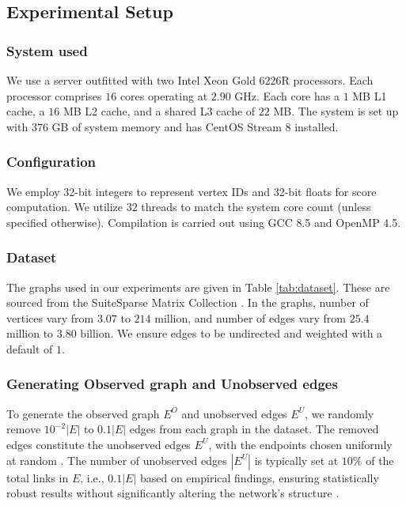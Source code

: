 \subsection{Experimental Setup}
\label{sec:setup}

\subsubsection{System used}

We use a server outfitted with two Intel Xeon Gold 6226R processors. Each processor comprises $16$ cores operating at $2.90$ GHz. Each core has a $1$ MB L1 cache, a $16$ MB L2 cache, and a shared L3 cache of $22$ MB. The system is set up with $376$ GB of system memory and has CentOS Stream 8 installed.\ok{}


\subsubsection{Configuration}

We employ 32-bit integers to represent vertex IDs and 32-bit floats for score computation. We utilize $32$ threads to match the system core count (unless specified otherwise). Compilation is carried out using GCC 8.5 and OpenMP 4.5.\ok{}


\subsubsection{Dataset}

The graphs used in our experiments are given in Table \ref{tab:dataset}. These are sourced from the SuiteSparse Matrix Collection \cite{suite19}. In the graphs, number of vertices vary from $3.07$ to $214$ million, and number of edges vary from $25.4$ million to $3.80$ billion. We ensure edges to be undirected and weighted with a default of $1$.




\subsubsection{Generating Observed graph and Unobserved edges}
\label{sec:generate-batch}

To generate the observed graph $E^O$ and unobserved edges $E^U$, we randomly remove $10^{-2}|E|$ to $0.1|E|$ edges from each graph in the dataset. The removed edges constitute the unobserved edges $E^U$, with the endpoints chosen uniformly at random \cite{zhou2021progresses}. The number of unobserved edges $|E^U|$ is typically set at $10\%$ of the total links in $E$, i.e., $0.1|E|$ based on empirical findings, ensuring statistically robust results without significantly altering the network's structure \cite{lu2015toward}.


